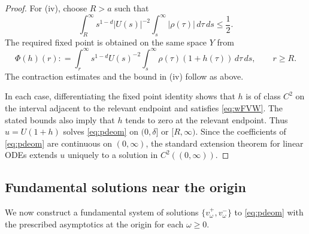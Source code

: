 \documentclass[12pt, a4paper, reqno]{amsart}
\numberwithin{equation}{section}
\theoremstyle{definition}
\theoremstyle{remark}
\newcommand{\ce}{\mathrel{\mathop:}=}
\begin{document}
\begin{proof}
For \textup{(iv)}, choose $R>a$ such that
\[
  \int_R^\infty s^{1-d}|U(s)|^{-2}
    \int_s^\infty|\rho(\tau)|\,d\tau\,ds
  \le\frac12.
\]
The required fixed point is obtained on the same space $Y$ from
\[
  \Phi(h)(r)
  \ce
  \int_r^\infty s^{1-d}U(s)^{-2}
    \int_s^\infty\rho(\tau)(1+h(\tau))\,d\tau\,ds,
  \qquad r\ge R.
\]
The contraction estimates and the bound in \textup{(iv)} follow as above.

In each case, differentiating the fixed point identity shows that
$h$ is of class $C^2$ on the interval adjacent to the relevant endpoint
and satisfies
\eqref{eq:wFVW}. The stated bounds also imply that $h$ tends to zero
at the relevant endpoint. Thus $u=U(1+h)$ solves \eqref{eq:pdeom}
on $(0,\delta]$ or $[R,\infty)$.
Since the coefficients of \eqref{eq:pdeom} are continuous on
$(0,\infty)$, the standard extension theorem for linear ODEs
extends $u$ uniquely to a solution in $C^2((0,\infty))$.
\end{proof}


\subsection{Fundamental solutions near the origin}

We now construct a fundamental system of solutions
$\{v_\omega^+,v_\omega^-\}$ to \eqref{eq:pdeom} with the prescribed
asymptotics at the origin for each $\omega\ge0$.
\end{document}
